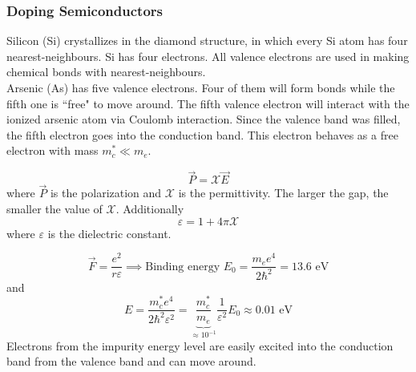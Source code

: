 \documentclass[12pt,a4paper,titlepage]{article}
\newcommand{\trm}[1]{\textrm{#1}} %
\newcommand{\Chi}{\mathcal{X}} %
\begin{document}
\subsubsection*{Doping Semiconductors}
Silicon (Si) crystallizes in the diamond structure, in which every Si atom has four nearest-neighbours. Si has four electrons. All valence electrons are used in making chemical bonds with nearest-neighbours.\\

Arsenic (As) has five valence electrons. Four of them will form bonds while the fifth one is ``free" to move around. The fifth valence electron will interact with the ionized arsenic atom via Coulomb interaction. Since the valence band was filled, the fifth electron goes into the conduction band. This electron behaves as a free electron with mass $m_{c}^{*}\ll m_{e}$.
\begin{center}
\end{center}
\begin{equation}
\vec{P}=\Chi\vec{E}
\end{equation}
where $\vec{P}$ is the polarization and $\Chi$ is the permittivity. The larger the gap, the smaller the value of $\Chi$. Additionally
\begin{equation}
\varepsilon = 1+4\pi\Chi
\end{equation}
where $\varepsilon$ is the dielectric constant.

\begin{equation}
\vec{F}=\frac{e^{2}}{r\varepsilon}\implies\trm{Binding energy }E_{0}=\frac{m_{e}e^{4}}{2\hbar^{2}}=13.6\trm{ eV}
\end{equation}
and
\begin{equation}
E=\frac{m_{c}^{*}e^{4}}{2\hbar^{2}\varepsilon^{2}}=\underbrace{\frac{m_{c}^{*}}{m_{e}}}_{\approx10^{-1}}\frac{1}{\varepsilon^{2}}E_{0}\approx 0.01\trm{ eV}
\end{equation}
Electrons from the impurity energy level are easily excited into the conduction band from the valence band and can move around.
\end{document}

